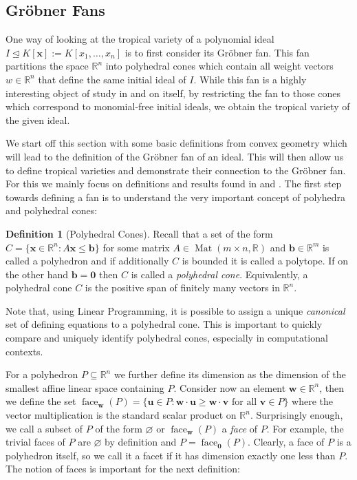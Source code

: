 \documentclass[
  paper=a4,
  titlepage,
  bibliography=totoc,
  listof=totoc,
  pagesize=pdftex
]{scrartcl}
\numberwithin{figure}{section}
\numberwithin{equation}{section}
\numberwithin{table}{section}
\newcommand*\setR{\mathds{R}}
\let\vec\mathbf
\let\idealof\trianglelefteq
\DeclareMathOperator{\Mat}{Mat}
\DeclareMathOperator{\face}{face}
\theoremstyle{definition}
\newtheorem{definition}{Definition}
\numberwithin{definition}{section}
\begin{document}
\subsection{Gröbner Fans}
\label{sec:grobFan}

One way of looking at the tropical variety of a polynomial ideal $I \idealof K[\vec x] :=
K[x_1, \dots, x_n]$ is to first consider its Gröbner fan. This fan partitions the space
$\setR^n$ into polyhedral cones which contain all weight vectors $w\in \setR^n$ that
define the same initial ideal of $I$. While this fan is a highly interesting object of
study in and on itself, by restricting the fan to those cones which correspond to
monomial-free initial ideals, we obtain the tropical variety of the given ideal.

We start off this section with some basic definitions from convex geometry which will lead
to the definition of the Gröbner fan of an ideal. This will then allow us to define
tropical varieties and demonstrate their connection to the Gröbner fan. For this we mainly
focus on definitions and results found in \cite{compGrobFan} and \cite{SturmGBCP}. The
first step towards defining a fan is to understand the very important concept of polyhedra
and polyhedral cones:

\begin{definition}[Polyhedral Cones]
  \label{def:polyhedralCone}
  Recall that a set of the form $C = \{ \vec x \in \setR^n : A\vec x \leq \vec b \}$ for
  some matrix $A \in \Mat(m\times n, \setR)$ and $\vec b \in \setR^m$ is called a
  polyhedron and if additionally $C$ is bounded it is called a polytope. If on the other
  hand $\vec b = \vec 0$ then $C$ is called a \emph{polyhedral cone}. Equivalently, a
  polyhedral cone $C$ is the positive span of finitely many vectors in $\setR^n$.
\end{definition}

Note that, using Linear Programming, it is possible to assign a unique \emph{canonical}
set of defining equations to a polyhedral cone. This is important to quickly compare and
uniquely identify polyhedral cones, especially in computational contexts.

For a polyhedron $P \subseteq \setR^n$ we further define its dimension as the dimension of
the smallest affine linear space containing $P$. Consider now an element $\vec w \in
\setR^n$, then we define the set $\face_{\vec w}(P) = \{ \vec u \in P : \vec w\cdot \vec u
\geq \vec w \cdot \vec v \text{ for all } \vec v\in P\}$ where the vector multiplication
is the standard scalar product on $\setR^n$. Surprisingly enough, we call a subset of $P$
of the form $\varnothing$ or $\face_{\vec w}(P)$ a \emph{face} of $P$. For example, the
trivial faces of $P$ are $\varnothing$ by definition and $P = \face_{\vec 0}(P)$. Clearly,
a face of $P$ is a polyhedron itself, so we call it a facet if it has dimension exactly
one less than $P$. The notion of faces is important for the next definition:
\end{document}
